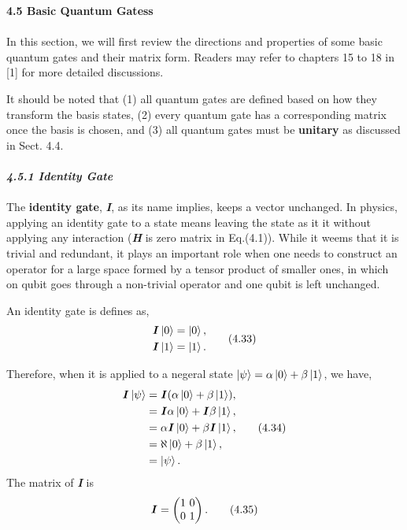 \documentclass{article}
\begin{document}
\textbf{\large 4.5 Basic Quantum Gatess}
\\\\
In this section, we will first review the directions and properties of some basic
quantum gates and their matrix form. Readers may refer to chapters 15 to 18 in [1]
for more detailed discussions.

It should be noted that (1) all quantum gates are defined based on how they
transform the basis states, (2) every quantum gate has a corresponding matrix once the basis is 
chosen, and (3) all quantum gates must be \textbf{unitary} as discussed in Sect. 4.4.
\\\\
\textbf{\textit{\large 4.5.1 Identity Gate}}
\\\\
The \textbf{identity gate}, \textbf{\textit{I}}, as its name implies, keeps a 
vector unchanged. In physics, applying an identity gate to a state
means leaving the state as it it without applying any interaction
(\textbf{\textit{H}} is zero matrix in Eq.(4.1)). While it weems that it is 
trivial and redundant, it plays an important role when one needs to construct an operator for
a large space formed by a tensor product of smaller ones, in which on qubit goes
through a non-trivial operator and one qubit is left unchanged.

An identity gate is defines as,
\begin{align} \label{eq 4.33}
    \begin{split}
        \textbf{\textit{I}}\ket{0} = \ket{0},\\
        \textbf{\textit{I}}\ket{1} = \ket{1}.\\
    \end{split} \tag{4.33}
\end{align}

Therefore, when it is applied to a negeral state $\ket{\psi} = \alpha\ket{0}+\beta\ket{1}$,
we have,
\begin{align} \label{eq 4.34}
    \begin{split}
         \textbf{\textit{I}}\ket{\psi} &=\textbf{\textit{I}}(\alpha\ket{0}+\beta\ket{1}), \\
        &= \textbf{\textit{I}}\alpha\ket{0}+\textbf{\textit{I}}\beta\ket{1}, \\
         &= \alpha\textbf{\textit{I}}\ket{0}+\beta\textbf{\textit{I}}\ket{1}, \\
        &= \aleph\ket{0}+ \beta\ket{1},\\
        &= \ket{\psi}.
    \end{split} \tag{4.34}
\end{align}
The matrix of \textit{\textbf{I}} is
\begin{equation} \label{eq 4.35}
    \textbf{\textit{I}}=\begin{pmatrix}
        1 \ 0\\0 \ 1
    \end{pmatrix}.\tag{4.35}
\end{equation}
\end{document}
